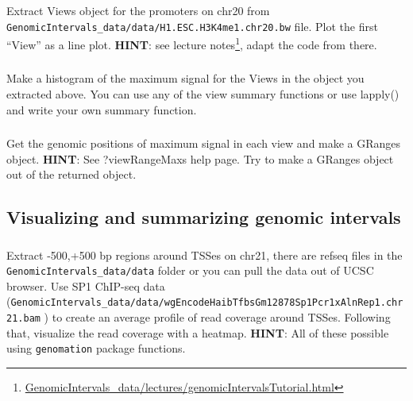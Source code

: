\documentclass[12pt,]{krantz}
\renewcommand{\href}[2]{#2\footnote{\url{#1}}}
\begin{document}
\hypertarget{section-16}{%
\subsubsection{}\label{section-16}}

Extract Views object for the promoters on chr20 from \texttt{GenomicIntervals\_data/data/H1.ESC.H3K4me1.chr20.bw} file. Plot the first ``View'' as a line plot. \textbf{HINT}: see \href{GenomicIntervals_data/lectures/genomicIntervalsTutorial.html}{lecture notes}, adapt the code from there.

\hypertarget{section-17}{%
\subsubsection{}\label{section-17}}

Make a histogram of the maximum signal for the Views in the object you extracted above. You can use any of the view summary functions or use lapply() and write your own summary function.

\hypertarget{section-18}{%
\subsubsection{}\label{section-18}}

Get the genomic positions of maximum signal in each view and make a GRanges object. \textbf{HINT}: See ?viewRangeMaxs help page. Try to make a GRanges object out of the returned object.

\hypertarget{visualizing-and-summarizing-genomic-intervals-1}{%
\subsection{Visualizing and summarizing genomic intervals}\label{visualizing-and-summarizing-genomic-intervals-1}}

\hypertarget{section-19}{%
\subsubsection{}\label{section-19}}

Extract -500,+500 bp regions around TSSes on chr21, there are refseq files in the \texttt{GenomicIntervals\_data/data} folder or you can
pull the data out of UCSC browser. Use SP1 ChIP-seq data
(\texttt{GenomicIntervals\_data/data/wgEncodeHaibTfbsGm12878Sp1Pcr1xAlnRep1.chr21.bam} ) to create an average profile of read coverage around TSSes. Following that, visualize the read coverage with a heatmap. \textbf{HINT}: All of these possible using \texttt{genomation} package functions.
\end{document}
